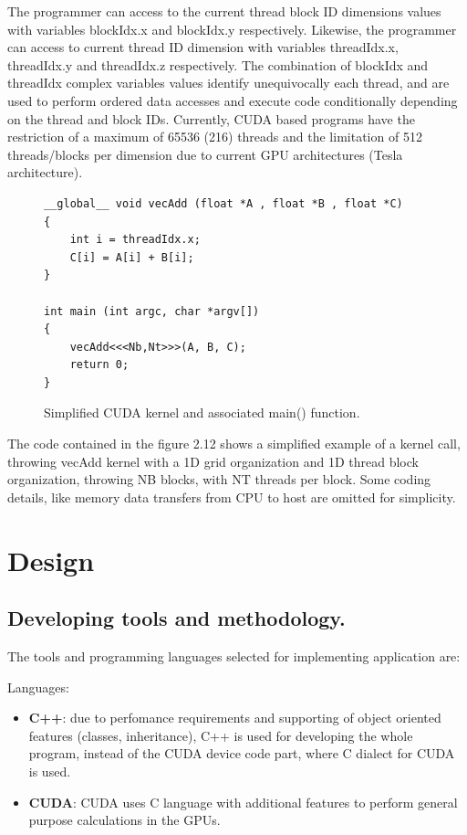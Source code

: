 \documentclass[thesis=M,english]{FITthesis}[2011/07/15]
\begin{document}
The programmer can access to the current thread block ID dimensions values with variables blockIdx.x and blockIdx.y respectively. Likewise, the programmer can access to current thread ID dimension with variables threadIdx.x, threadIdx.y and threadIdx.z respectively. The combination of blockIdx and threadIdx complex variables values identify unequivocally each thread, and are used to perform ordered data accesses and execute code conditionally depending on the thread and block IDs. Currently, CUDA based programs have the restriction of a maximum of 65536 (216) threads and the limitation of 512 threads/blocks per dimension due to current GPU architectures (Tesla architecture).

\begin{figure}[h]
\begin{lstlisting}
__global__ void vecAdd (float *A , float *B , float *C)
{
	int i = threadIdx.x;
	C[i] = A[i] + B[i];
}

int main (int argc, char *argv[])
{
	vecAdd<<<Nb,Nt>>>(A, B, C);
	return 0;
}

\end{lstlisting}
\caption{Simplified CUDA kernel and associated main() function.}
\label{fig:cuda_threads}
\end{figure}

The code contained in the figure 2.12 shows a simplified example of a kernel call, throwing vecAdd kernel with a 1D grid organization and 1D thread block organization, throwing NB blocks, with NT threads per block. Some coding details, like memory data transfers from CPU to host are omitted for simplicity.


\chapter{Design}
\label{chap:design}

\section{Developing tools and methodology.}
The tools and programming languages selected for implementing application are:

Languages:

\begin{itemize}
\item \textbf{C++}: due to perfomance requirements and supporting of object oriented features (classes, inheritance), C++ is used for developing the whole program, instead of the CUDA device code part, where C dialect for CUDA is used.
\item \textbf{CUDA}: CUDA uses C language with additional features to perform general purpose calculations in the GPUs.
\end{itemize}
\end{document}
